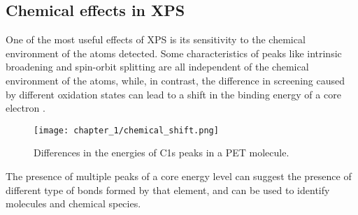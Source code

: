 \subsection{Chemical effects in XPS}
\label{subsec:chemical_eff_xps}
One of the most useful effects of XPS is its sensitivity to the chemical environment of the atoms detected. Some characteristics of peaks like intrinsic broadening and spin-orbit splitting are all independent of the chemical environment of the atoms, while, in contrast, the difference in screening caused by different oxidation states can lead to a shift in the binding energy of a core electron \cite{wattsIntroductionSurfaceAnalysis2003}.
\begin{figure}[H]
    \centering
    \texttt{[image: chapter\_1/chemical\_shift.png]}
    \vspace*{-10pt}
    \caption{Differences in the energies of C1s peaks in a PET molecule. \cite{mitchellXPSChemicalShift2020}}
    \label{fig:chemical_shift}
\end{figure}
The presence of multiple peaks of a core energy level can suggest the presence of different type of bonds formed by that element, and can be used to identify molecules and chemical species.
